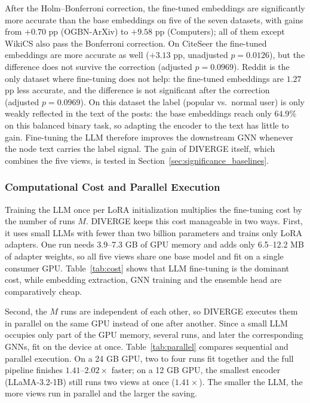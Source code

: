 \documentclass[a4paper,fleqn]{cas-sc}
\newcommand{\revthree}[1]{\textcolor{revgreen}{#1}} %
\DeclareRobustCommand{\revcommon}[2][]{\textcolor{revshared}{#2}} %
\begin{document}
\revthree{After the Holm--Bonferroni correction, the fine-tuned embeddings are significantly more accurate than the base embeddings on five of the seven datasets, with gains from $+0.70$ pp (OGBN-ArXiv) to $+9.58$ pp (Computers); all of them except WikiCS also pass the Bonferroni correction. On CiteSeer the fine-tuned embeddings are more accurate as well ($+3.13$ pp, unadjusted $p=0.0126$), but the difference does not survive the correction (adjusted $p=0.0969$). Reddit is the only dataset where fine-tuning does not help: the fine-tuned embeddings are $1.27$ pp less accurate, and the difference is not significant after the correction (adjusted $p=0.0969$). On this dataset the label (popular vs.\ normal user) is only weakly reflected in the text of the posts: the base embeddings reach only $64.9\%$ on this balanced binary task, so adapting the encoder to the text has little to gain. Fine-tuning the LLM therefore improves the downstream GNN whenever the node text carries the label signal. The gain of DIVERGE itself, which combines the five views, is tested in Section~\ref{sec:significance_baselines}.}

\subsubsection{\revcommon{Computational Cost and Parallel Execution}}\label{sec:efficiency}

\revcommon[R1,R2,R4]{Training the LLM once per LoRA initialization multiplies the fine-tuning cost by the number of runs $M$. DIVERGE keeps this cost manageable in two ways. First, it uses small LLMs with fewer than two billion parameters and trains only LoRA adapters. One run needs 3.9--7.3 GB of GPU memory and adds only 6.5--12.2 MB of adapter weights, so all five views share one base model and fit on a single consumer GPU. Table~\ref{tab:cost} shows that LLM fine-tuning is the dominant cost, while embedding extraction, GNN training and the ensemble head are comparatively cheap.}

\revcommon[R1,R2,R4]{Second, the $M$ runs are independent of each other, so DIVERGE executes them in parallel on the same GPU instead of one after another. Since a small LLM occupies only part of the GPU memory, several runs, and later the corresponding GNNs, fit on the device at once. Table~\ref{tab:parallel} compares sequential and parallel execution. On a 24 GB GPU, two to four runs fit together and the full pipeline finishes $1.41$--$2.02\times$ faster; on a 12 GB GPU, the smallest encoder (LLaMA-3.2-1B) still runs two views at once ($1.41\times$). The smaller the LLM, the more views run in parallel and the larger the saving.}
\end{document}
